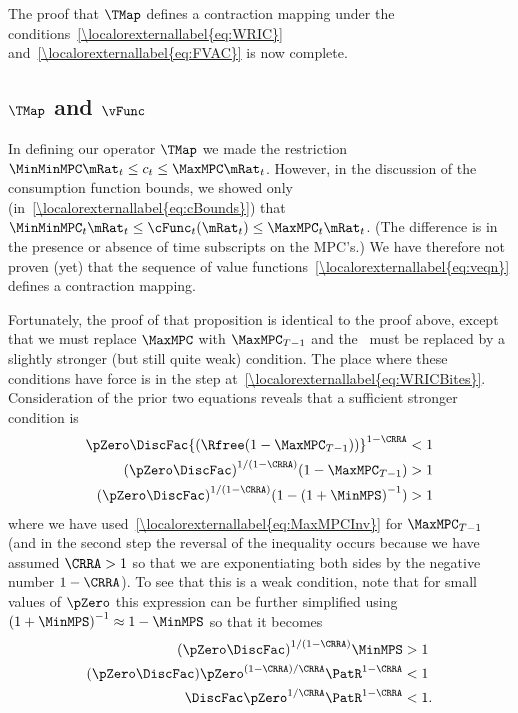 \documentclass[\econtexRoot/BufferStockTheory]{subfiles}
\begin{document}
The proof that $\TMap$ defines a contraction mapping under the
conditions~\eqref{\localorexternallabel{eq:WRIC}} and~\eqref{\localorexternallabel{eq:FVAC}} is
now complete.

\subsection{
  \texorpdfstring{$\TMap$}{T} and \texorpdfstring{$\vFunc$}{v}}

In defining our operator $\TMap$ we made the restriction
$\MinMinMPC \mRat_{t} \leq c_{t} \leq \MaxMPC \mRat_{t}$.  However,
in the discussion of the consumption function bounds, we
showed only (in~\eqref{\localorexternallabel{eq:cBounds}}) that $\MinMinMPC_{t} \mRat_{t} \leq \cFunc_{t}(\mRat_{t})
\leq \MaxMPC_{t} \mRat_{t}$.  (The difference is in the presence
or absence of time subscripts on the MPC's.)
  We have therefore
not proven (yet) that the sequence of value functions~\eqref{\localorexternallabel{eq:veqn}} defines a contraction mapping.

Fortunately, the proof of that proposition is identical to the proof above, except that we must replace
$\MaxMPC$ with $\MaxMPC_{T-1}$ and the \WRIC~must be
replaced by a slightly stronger (but still quite weak) condition.  The place where these
conditions have force is in the step at~\eqref{\localorexternallabel{eq:WRICBites}}.
Consideration of the prior two equations reveals that
a sufficient stronger condition is
\begin{align*}
    \pZero \DiscFac {(\Rfree (1-\MaxMPC_{T-1}))}^{1-\CRRA}  & < 1
\\  {(\pZero \DiscFac)}^{1/(1-\CRRA)}  (1-\MaxMPC_{T-1})  & > 1
\\  {(\pZero \DiscFac)}^{1/(1-\CRRA)}  (1-{(1+\MinMPS)}^{-1})  & > 1
\end{align*}
where we have used~\eqref{\localorexternallabel{eq:MaxMPCInv}} for $\MaxMPC_{T-1}$ (and in the second step the reversal of the inequality occurs because we have assumed $\CRRA > 1$ so that we are exponentiating both sides by the negative number $1-\CRRA$).  To see that this is a weak condition, note that for small values of
$\pZero$ this expression can be further simplified using ${(1+\MinMPS)}^{-1}
\approx 1-\MinMPS$ so that it becomes
\begin{align*}
  {(\pZero \DiscFac)}^{1/(1-\CRRA)}  \MinMPS  & > 1
\\  (\pZero \DiscFac)  \pZero^{(1-\CRRA)/\CRRA} \PatR^{1-\CRRA}  & < 1
\\  \DiscFac  \pZero^{1/\CRRA} \PatR^{1-\CRRA}  & < 1.
\end{align*}
\end{document}
